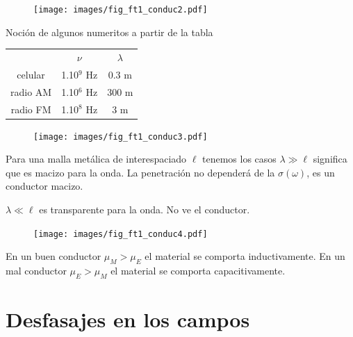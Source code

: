 \documentclass[10pt,oneside]{CBFT_book}
\begin{document}
\begin{figure}[htb]
	\begin{center}
	\texttt{[image: images/fig\_ft1\_conduc2.pdf]}	 
	\end{center}
	\caption{}
\end{figure} 

Noción de algunos numeritos a partir de la tabla

\begin{center}
\begin{tabular}{ c c c }
& $\nu$ & $\lambda$ \\
celular & 1.10$^9$ Hz & 0.3 m \\
radio AM  & 1.10$^6$ Hz  & 300 m \\
radio FM & 1.10$^8$ Hz & 3 m
\end{tabular}
\end{center}



\begin{figure}[htb]
	\begin{center}
	\texttt{[image: images/fig\_ft1\_conduc3.pdf]}	 
	\end{center}
	\caption{}
\end{figure} 

Para una malla metálica de interespaciado $\ell$ tenemos los casos
$\lambda \gg \ell$ significa que es macizo para la onda. La penetración no dependerá
de la $\sigma(\omega)$, es un conductor macizo.

$\lambda \ll \ell$ es transparente para la onda. No ve el conductor.

\begin{figure}[htb]
	\begin{center}
	\texttt{[image: images/fig\_ft1\_conduc4.pdf]}	 
	\end{center}
	\caption{}
\end{figure} 

En un buen conductor $ \mu_M > \mu_E $ el material se comporta inductivamente.
En un mal conductor $ \mu_E > \mu_M $ el material se comporta capacitivamente.

\section{Desfasajes en los campos}
\end{document}
